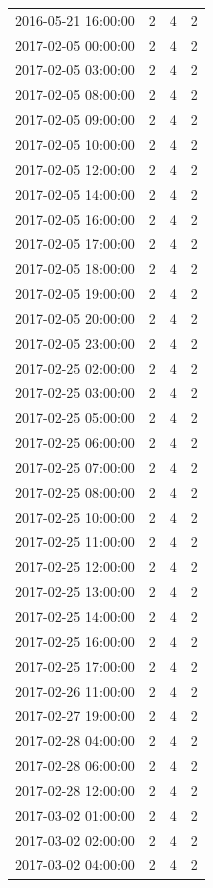 \begin{tabular}{lrrr}
2016-05-21 16:00:00 & 2 & 4 & 2 \\
2017-02-05 00:00:00 & 2 & 4 & 2 \\
2017-02-05 03:00:00 & 2 & 4 & 2 \\
2017-02-05 08:00:00 & 2 & 4 & 2 \\
2017-02-05 09:00:00 & 2 & 4 & 2 \\
2017-02-05 10:00:00 & 2 & 4 & 2 \\
2017-02-05 12:00:00 & 2 & 4 & 2 \\
2017-02-05 14:00:00 & 2 & 4 & 2 \\
2017-02-05 16:00:00 & 2 & 4 & 2 \\
2017-02-05 17:00:00 & 2 & 4 & 2 \\
2017-02-05 18:00:00 & 2 & 4 & 2 \\
2017-02-05 19:00:00 & 2 & 4 & 2 \\
2017-02-05 20:00:00 & 2 & 4 & 2 \\
2017-02-05 23:00:00 & 2 & 4 & 2 \\
2017-02-25 02:00:00 & 2 & 4 & 2 \\
2017-02-25 03:00:00 & 2 & 4 & 2 \\
2017-02-25 05:00:00 & 2 & 4 & 2 \\
2017-02-25 06:00:00 & 2 & 4 & 2 \\
2017-02-25 07:00:00 & 2 & 4 & 2 \\
2017-02-25 08:00:00 & 2 & 4 & 2 \\
2017-02-25 10:00:00 & 2 & 4 & 2 \\
2017-02-25 11:00:00 & 2 & 4 & 2 \\
2017-02-25 12:00:00 & 2 & 4 & 2 \\
2017-02-25 13:00:00 & 2 & 4 & 2 \\
2017-02-25 14:00:00 & 2 & 4 & 2 \\
2017-02-25 16:00:00 & 2 & 4 & 2 \\
2017-02-25 17:00:00 & 2 & 4 & 2 \\
2017-02-26 11:00:00 & 2 & 4 & 2 \\
2017-02-27 19:00:00 & 2 & 4 & 2 \\
2017-02-28 04:00:00 & 2 & 4 & 2 \\
2017-02-28 06:00:00 & 2 & 4 & 2 \\
2017-02-28 12:00:00 & 2 & 4 & 2 \\
2017-03-02 01:00:00 & 2 & 4 & 2 \\
2017-03-02 02:00:00 & 2 & 4 & 2 \\
2017-03-02 04:00:00 & 2 & 4 & 2 \\

\end{tabular}

